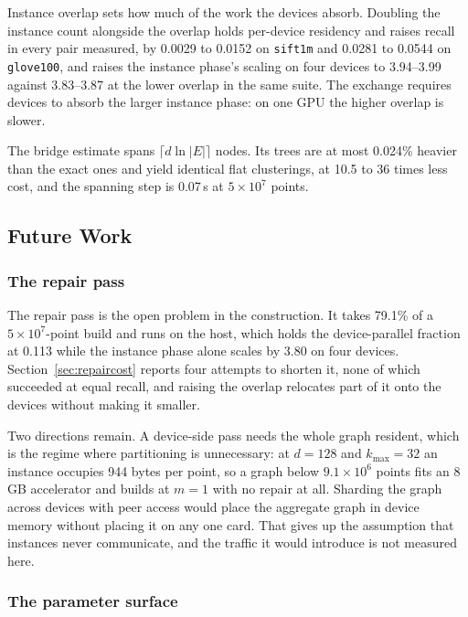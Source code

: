 \documentclass{ieeeaccess}
\newcommand{\kmax}{k_{\max}}
\begin{document}
Instance overlap sets how much of the work the devices absorb. Doubling the instance count alongside the overlap holds per-device
residency and raises recall in every pair measured, by 0.0029 to 0.0152 on
\texttt{sift1m} and 0.0281 to 0.0544 on \texttt{glove100}, and raises the
instance phase's scaling on four devices to 3.94--3.99 against 3.83--3.87 at the
lower overlap in the same suite. The exchange requires devices to absorb the
larger instance phase: on one GPU the higher overlap is slower.

The bridge estimate spans $\lceil d \ln |E| \rceil$ nodes. Its trees are at most
0.024\% heavier than the exact ones and yield identical flat clusterings, at
10.5 to 36 times less cost, and the spanning step is 0.07\,s at $5\times10^7$
points.

\subsection{Future Work}

\subsubsection{The repair pass}

The repair pass is the open problem in the construction. It takes 79.1\% of a
$5\times10^7$-point build and runs on the host, which holds the device-parallel
fraction at 0.113 while the instance phase alone scales by 3.80 on four devices.
Section~\ref{sec:repaircost} reports four attempts to shorten it, none of which
succeeded at equal recall, and raising the overlap relocates part of it onto the
devices without making it smaller.

Two directions remain. A device-side pass needs the whole graph resident, which
is the regime where partitioning is unnecessary: at $d = 128$ and $\kmax = 32$ an
instance occupies 944 bytes per point, so a graph below $9.1\times10^6$ points
fits an 8\,GB accelerator and builds at $m = 1$ with no repair at all. Sharding
the graph across devices with peer access would place the aggregate graph in
device memory without placing it on any one card. That gives up the assumption
that instances never communicate, and the traffic it would introduce is not
measured here.

\subsubsection{The parameter surface}
\end{document}
